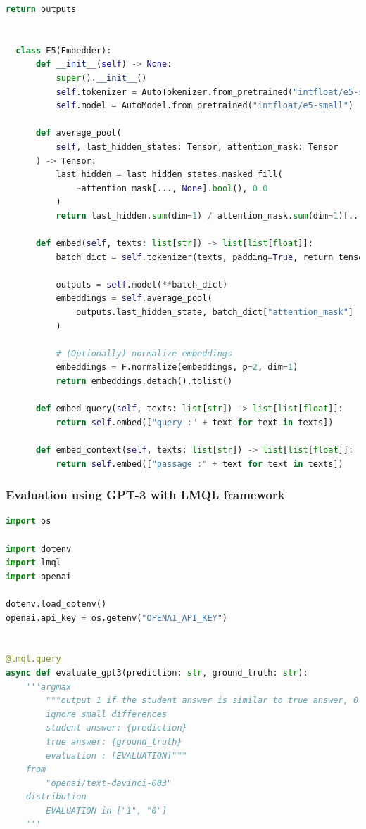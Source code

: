 \documentclass[a4paper,12pt]{article}
\begin{document}
\begin{lstlisting}[language=Python]
          return outputs
  
  
  class E5(Embedder):
      def __init__(self) -> None:
          super().__init__()
          self.tokenizer = AutoTokenizer.from_pretrained("intfloat/e5-small")
          self.model = AutoModel.from_pretrained("intfloat/e5-small")
  
      def average_pool(
          self, last_hidden_states: Tensor, attention_mask: Tensor
      ) -> Tensor:
          last_hidden = last_hidden_states.masked_fill(
              ~attention_mask[..., None].bool(), 0.0
          )
          return last_hidden.sum(dim=1) / attention_mask.sum(dim=1)[..., None]
  
      def embed(self, texts: list[str]) -> list[list[float]]:
          batch_dict = self.tokenizer(texts, padding=True, return_tensors="pt")
  
          outputs = self.model(**batch_dict)
          embeddings = self.average_pool(
              outputs.last_hidden_state, batch_dict["attention_mask"]
          )
  
          # (Optionally) normalize embeddings
          embeddings = F.normalize(embeddings, p=2, dim=1)
          return embeddings.detach().tolist()
  
      def embed_query(self, texts: list[str]) -> list[list[float]]:
          return self.embed(["query :" + text for text in texts])
  
      def embed_context(self, texts: list[str]) -> list[list[float]]:
          return self.embed(["passage :" + text for text in texts])
\end{lstlisting}

\subsubsection{Evaluation using GPT-3 \cite{gpt3} with LMQL framework \cite{lmql}} 
\label{ann:evaluation}
\begin{lstlisting}[language=Python]
import os

import dotenv
import lmql
import openai

dotenv.load_dotenv()
openai.api_key = os.getenv("OPENAI_API_KEY")


@lmql.query
async def evaluate_gpt3(prediction: str, ground_truth: str):
    '''argmax
        """output 1 if the student answer is similar to true answer, 0 otherwise
        ignore small differences
        student answer: {prediction}
        true answer: {ground_truth}
        evaluation : [EVALUATION]"""
    from
        "openai/text-davinci-003"
    distribution
        EVALUATION in ["1", "0"]
    '''  
\end{lstlisting}
\end{document}
